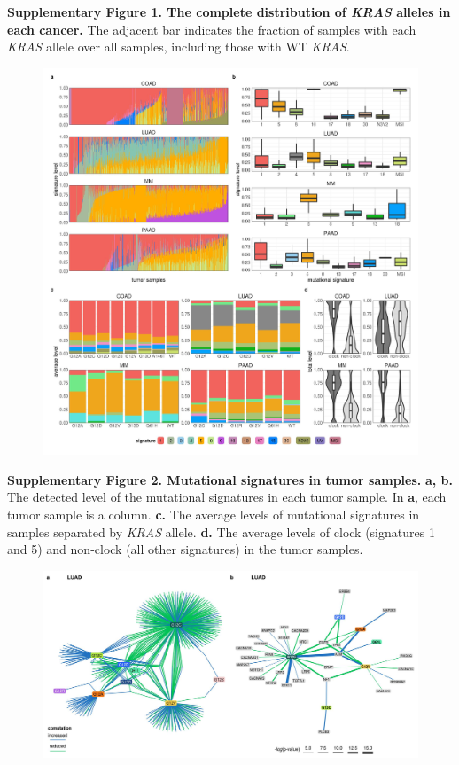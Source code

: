 \documentclass[english, 10pt, letterpaper]{article}
\newcommand{\KRAS}{\emph{KRAS}}
\begin{document}
\noindent \textbf{Supplementary Figure 1. The complete distribution of \KRAS{} alleles in each cancer.} The adjacent bar indicates the fraction of samples with each \KRAS{} allele over all samples, including those with WT \KRAS{}.
\newpage


\begin{figure}[h!]
\centering
\includegraphics[width=180mm]{figures/Supp_Fig_2.jpeg}
\label{sfig:mutational-signatures-supp}
\end{figure}

\noindent \textbf{Supplementary Figure 2. Mutational signatures in tumor samples.}
\textbf{a, b.} The detected level of the mutational signatures in each tumor sample. In \textbf{a}, each tumor sample is a column.
\textbf{c.} The average levels of mutational signatures in samples separated by \KRAS{} allele.
\textbf{d.} The average levels of clock (signatures 1 and 5) and non-clock (all other signatures) in the tumor samples.
\newpage


\begin{figure}[h!]
\centering
\includegraphics[width=180mm]{figures/Supp_Fig_3.jpeg}
\label{sfig:luad-comutation-network}
\end{figure}
\end{document}
